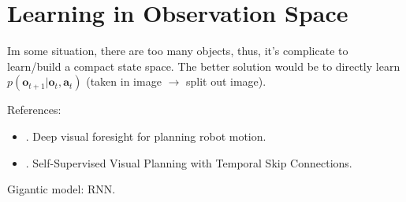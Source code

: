 \section{Learning in Observation Space}
Im some situation, there are too many objects, thus, it's complicate to learn/build a compact state space. The better solution would be to directly learn $p(\textbf{o}_{t+1} | \textbf{o}_t, \textbf{a}_t)$ (taken in image $\rightarrow$ split out image).

References:
\begin{itemize}
	\item {}. Deep visual foresight for planning robot motion.
	\item {}. Self-Supervised Visual Planning with Temporal Skip Connections.
\end{itemize}

Gigantic model: \ac{RNN}. 
